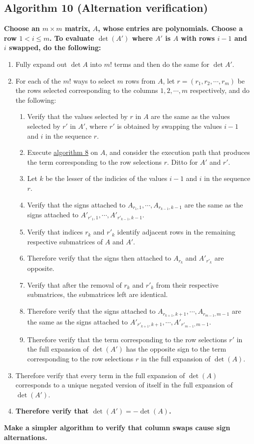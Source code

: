\documentclass[twocolumn]{article}
\begin{document}
		\subsection{Algorithm 10 (Alternation verification)}\label{sec:algorithm 10}
			\textbf{Choose an $m\times m$ matrix, $A$, whose entries are polynomials. Choose a row $1<i\le m$. To evaluate $\det(A')$ where $A'$ is $A$ with rows $i-1$ and $i$ swapped, do the following:}
			\begin{enumerate}
				\item Fully expand out $\det A$ into $m!$ terms and then do the same for $\det A'$.
				\item For each of the $m!$ ways to select $m$ rows from $A$, let $r=(r_1, r_2, \cdots, r_m)$ be the rows selected corresponding to the columns $1, 2, \cdots, m$ respectively, and do the following:
				\begin{enumerate}
					\item Verify that the values selected by $r$ in $A$ are the same as the values selected by $r'$ in $A'$, where $r'$ is obtained by swapping the values $i-1$ and $i$ in the sequence $r$.
					\item Execute \hyperref[sec:algorithm 8]{algorithm 8} on $A$, and consider the execution path that produces the term corresponding to the row selections $r$. Ditto for $A'$ and $r'$.
					\item Let $k$ be the lesser of the indicies of the values $i-1$ and $i$ in the sequence $r$.
					\item Verify that the signs attached to $A_{r_1,1},\cdots,A_{r_{k-1},k-1}$ are the same as the signs attached to $A'_{r'_1,1},\cdots,A'_{r'_{k-1},k-1}$.
					\item Verify that indices $r_k$ and $r'_k$ identify adjacent rows in the remaining respective submatrices of $A$ and $A'$.
					\item Therefore verify that the signs then attached to $A_{r_k}$ and $A'_{r'_k}$ are opposite.
					\item Verify that after the removal of $r_k$ and $r'_k$ from their respective submatrices, the submatrices left are identical.
					\item Therefore verify that the signs attached to $A_{r_{k+1},k+1},\cdots,A_{r_{m-1},m-1}$ are the same as the signs attached to $A'_{r'_{k+1},k+1},\cdots,A'_{r'_{m-1},m-1}$.
					\item Therefore verify that the term corresponding to the row selections $r'$ in the full expansion of $\det(A')$ has the opposite sign to the term corresponding to the row selections $r$ in the full expansion of $\det(A)$.
				\end{enumerate}
				\item Therefore verify that every term in the full expansion of $\det(A)$ corresponds to a unique negated version of itself in the full expansion of $\det(A')$.
				\item\textbf{Therefore verify that $\det(A')=-\det(A)$.}
			\end{enumerate}
			\textbf{Make a simpler algorithm to verify that column swaps cause sign alternations.}
\end{document}
